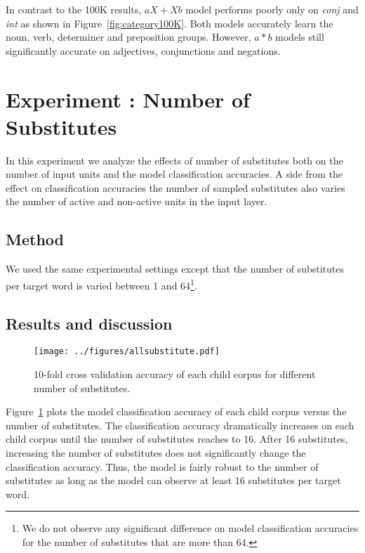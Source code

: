 In contrast to the 100K results, $aX+Xb$ model performs poorly only on {\it
conj} and {\it int} as shown in Figure~\ref{fig:category100K}.  Both models
accurately learn the noun, verb, determiner and preposition groups.  However,
$a*b$ models still significantly accurate on adjectives, conjunctions and
negations.

\section{Experiment : Number of Substitutes}
\label{s:exp_substitutes}
In this experiment we analyze the effects of number of substitutes both on the
number of input units and the model classification accuracies.  A side from the
effect on classification accuracies the number of sampled substitutes also
varies the number of active and non-active units in the input layer.  

\subsection{Method} 
We used the same experimental settings except that the number of substitutes
per target word is varied between 1 and 64\footnote{We do not observe any
significant difference on model classification accuracies for the number of
substitutes that are more than 64.}.

\subsection{Results and discussion}
\begin{figure}[ht]
  \centering
  \texttt{[image: ../figures/allsubstitute.pdf]}
  \caption{10-fold cross validation accuracy of each child corpus for different
  number of substitutes.}
  \label{fig:substitutes}
\end{figure} 

Figure~\ref{fig:substitutes} plots the model classification accuracy of each
child corpus versus the number of substitutes.  The classification accuracy
dramatically increases on each child corpus until the number of substitutes
reaches to 16. After 16 substitutes, increasing the number of substitutes
does not significantly change the classification accuracy. Thus, the 
model is fairly robust to the number of substitutes as long as the
model can observe at least 16 substitutes per target word.

